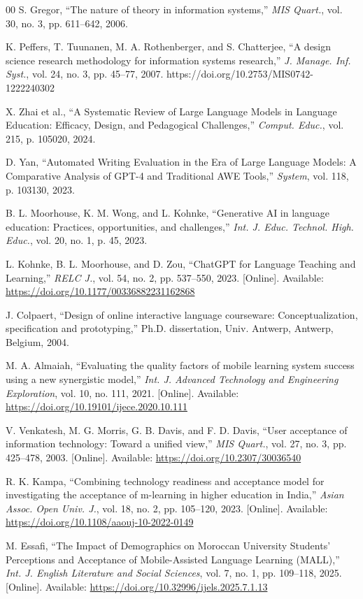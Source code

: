 \documentclass[11pt,a4paper]{article}
\begin{document}
\begin{thebibliography}{00}
S. Gregor, ``The nature of theory in information systems,'' \textit{MIS Quart.}, vol. 30, no. 3, pp. 611--642, 2006.

K. Peffers, T. Tuunanen, M. A. Rothenberger, and S. Chatterjee, ``A design science research methodology for information systems research,'' \textit{J. Manage. Inf. Syst.}, vol. 24, no. 3, pp. 45--77, 2007. https://doi.org/10.2753/MIS0742-1222240302

X. Zhai et al., ``A Systematic Review of Large Language Models in Language Education: Efficacy, Design, and Pedagogical Challenges,'' \textit{Comput. Educ.}, vol. 215, p. 105020, 2024.

D. Yan, ``Automated Writing Evaluation in the Era of Large Language Models: A Comparative Analysis of GPT-4 and Traditional AWE Tools,'' \textit{System}, vol. 118, p. 103130, 2023.

B. L. Moorhouse, K. M. Wong, and L. Kohnke, ``Generative AI in language education: Practices, opportunities, and challenges,'' \textit{Int. J. Educ. Technol. High. Educ.}, vol. 20, no. 1, p. 45, 2023.

L. Kohnke, B. L. Moorhouse, and D. Zou, ``{ChatGPT} for Language Teaching and Learning,'' \textit{RELC J.}, vol. 54, no. 2, pp. 537--550, 2023. [Online]. Available: \url{https://doi.org/10.1177/00336882231162868}

J. Colpaert, ``Design of online interactive language courseware: Conceptualization, specification and prototyping,'' Ph.D. dissertation, Univ. Antwerp, Antwerp, Belgium, 2004.

M. A. Almaiah, ``Evaluating the quality factors of mobile learning system success using a new synergistic model,'' \textit{Int. J. Advanced Technology and Engineering Exploration}, vol. 10, no. 111, 2021. [Online]. Available: \url{https://doi.org/10.19101/ijece.2020.10.111}

V. Venkatesh, M. G. Morris, G. B. Davis, and F. D. Davis, ``User acceptance of information technology: Toward a unified view,'' \textit{MIS Quart.}, vol. 27, no. 3, pp. 425--478, 2003. [Online]. Available: \url{https://doi.org/10.2307/30036540}

R. K. Kampa, ``Combining technology readiness and acceptance model for investigating the acceptance of m-learning in higher education in India,'' \textit{Asian Assoc. Open Univ. J.}, vol. 18, no. 2, pp. 105--120, 2023. [Online]. Available: \url{https://doi.org/10.1108/aaouj-10-2022-0149}

M. Essafi, ``The Impact of Demographics on Moroccan University Students' Perceptions and Acceptance of Mobile-Assisted Language Learning (MALL),'' \textit{Int. J. English Literature and Social Sciences}, vol. 7, no. 1, pp. 109--118, 2025. [Online]. Available: \url{https://doi.org/10.32996/ijels.2025.7.1.13}

\end{thebibliography}
\end{document}
